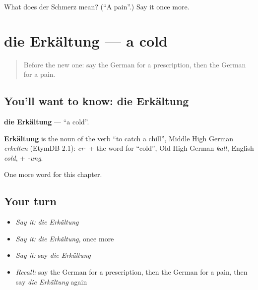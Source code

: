 \begin{tcolorbox}[breakable,colback=teal!4,colframe=teal!35!black,title={Before you move on}]
What does der Schmerz mean? (\textquotedblleft{}A pain\textquotedblright{}.) Say it once more.
\end{tcolorbox}
\section[die Erkältung]{die Erkältung — a cold}

\label{lesson:GE-C156-erkaeltung}



\begin{quote}
Before the new one: say the German for a prescription, then the German for a pain.
\end{quote}

\subsection*{You'll want to know: die Erkältung}
\textbf{die Erkältung} — \textquotedblleft{}a cold\textquotedblright{}.

\begin{cousinweb}
\textbf{Erkältung} is the noun of the verb \textquotedblleft{}to catch a chill\textquotedblright{}, Middle High German \emph{erkelten} (EtymDB 2.1): \emph{er-} + the word for \textquotedblleft{}cold\textquotedblright{}, Old High German \emph{kalt}, English \emph{cold}, + \emph{-ung}.
\end{cousinweb}

\begin{grammarlens}[title={What you've built}]
One more word for this chapter.
\end{grammarlens}

\subsection*{Your turn}
\begin{itemize}
\raggedright
  \item \emph{Say it:} \emph{die Erkältung}
  \item \emph{Say it:} \emph{die Erkältung}, once more
  \item \emph{Say it:} say \emph{die Erkältung}
  \item \emph{Recall:} say the German for a prescription, then the German for a pain, then say \emph{die Erkältung} again
\end{itemize}

